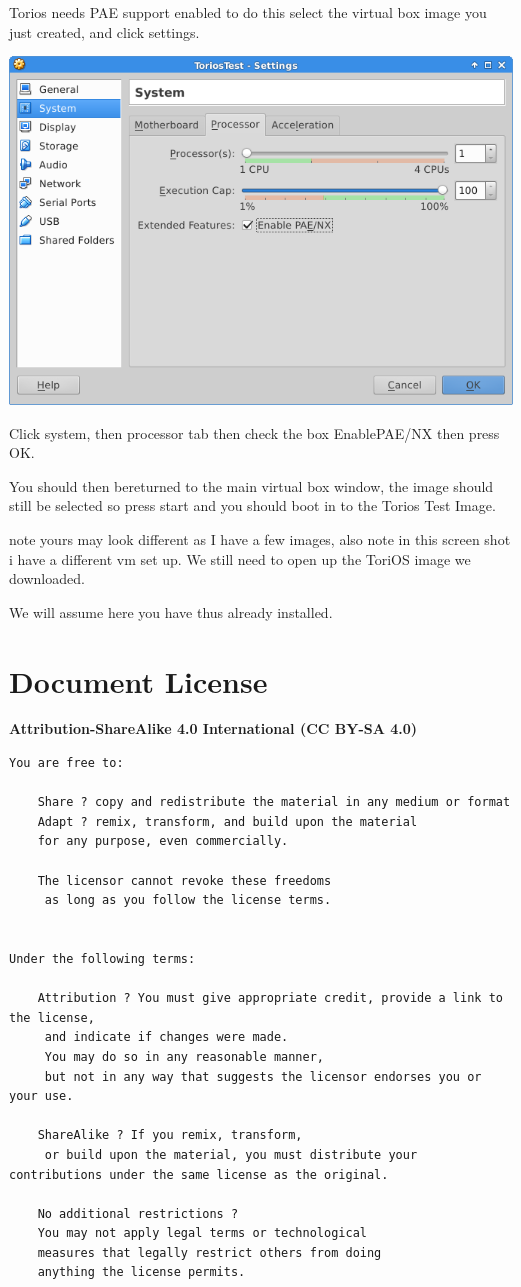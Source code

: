 \documentclass[12pt,a4paper]{book}
\begin{document}
Torios needs PAE support enabled to do this select the virtual box image you just created,  and click settings.

\begin{center}
\includegraphics[width=0.7\linewidth]{ToriosEnablePAE}
\end{center}

Click system, then processor tab then check the box EnablePAE/NX then press OK.

You should then bereturned to the main virtual box window,  the image should still be selected so press start and you should boot in to the Torios Test Image. 

 note yours may look different as I have a few images,  also note in this screen shot i have a different vm set up.  We still need to open up the ToriOS image we downloaded. 

We will assume here you have thus already installed.


\chapter{Document License}
\textbf{Attribution-ShareAlike 4.0 International (CC BY-SA 4.0)}

\begin{verbatim}
You are free to:

    Share ? copy and redistribute the material in any medium or format
    Adapt ? remix, transform, and build upon the material
    for any purpose, even commercially.

    The licensor cannot revoke these freedoms
     as long as you follow the license terms.


Under the following terms:

    Attribution ? You must give appropriate credit, provide a link to the license,
     and indicate if changes were made. 
     You may do so in any reasonable manner, 
     but not in any way that suggests the licensor endorses you or your use.

    ShareAlike ? If you remix, transform,
     or build upon the material, you must distribute your contributions under the same license as the original.

    No additional restrictions ? 
    You may not apply legal terms or technological 
    measures that legally restrict others from doing 
    anything the license permits.


\end{verbatim}
\end{document}
